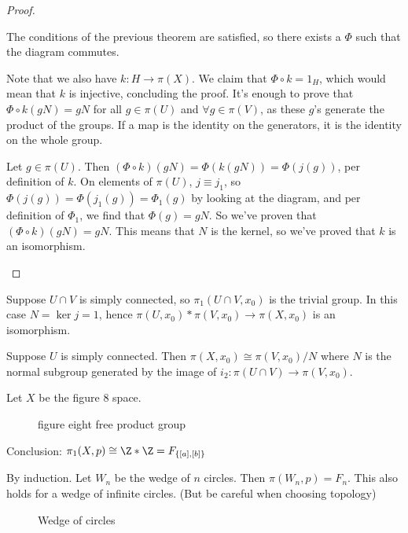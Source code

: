 \begin{proof}
\begin{itemize}
            The conditions of the previous theorem are satisfied, so there exists a $\Phi$ such that the diagram commutes.

            Note that we also have $k: H \to  \pi(X)$.
            We claim that $\Phi  \circ  k = 1_H$, which would mean that $k$ is injective, concluding the proof.
            It's enough to prove that $\Phi  \circ  k(gN) = gN$ for all $g \in \pi(U)$ and $\forall g \in \pi(V)$, as these $g$'s generate the product of the groups. If a map is the identity on the generators, it is the identity on the whole group.

            Let $g \in \pi(U)$. Then $(\Phi  \circ  k) (gN) = \Phi(k(gN)) = \Phi(j(g))$, per definition of $k$.
            On elements of $\pi(U)$, $j \equiv j_1$, so $\Phi(j(g)) = \Phi(j_1(g)) = \Phi_1(g)$ by looking at the diagram, and per definition of $\Phi_1$, we find that $\Phi(g) = gN$. So we've proven that $(\Phi  \circ  k) (gN) = gN$.
            This means that $N$ is the kernel, so we've proved that $k$ is an isomorphism.
    \end{itemize}
\end{proof}
\begin{corollary}
    Suppose $ U \cap  V$ is simply connected, so $\pi_1(U \cap V, x_0)$ is the trivial group.
    In this case $N = \ker j = 1$, hence $\pi(U, x_0) * \pi(V, x_0) \to \pi(X, x_0)$ is an isomorphism.
\end{corollary}

\begin{corollary}
    Suppose $U$ is simply connected.
    Then $\pi(X, x_0) \cong \pi(V, x_0) / N$ where $N$ is the normal subgroup generated by the image of $i_2: \pi(U \cap V) \to  \pi(V, x_0)$.
\end{corollary}
\begin{eg}
    Let $X$ be the figure $8$ space.

\begin{figure}[H]
    \centering
    \caption{figure eight free product group}
    \label{fig:figure-eight-free-product-group}
\end{figure}
Conclusion: $\pi_1(X, p) \cong \Z * \Z = F_{\{[a], [b]\} }$
\end{eg}

\begin{eg}
    By induction. Let $W_n$ be the wedge of $n$ circles.
    Then $\pi(W_n, p) = F_n$.
    This also holds for a wedge of infinite circles. (But be careful when choosing topology)
\begin{figure}[H]
    \centering
    \caption{Wedge of circles}
    \label{fig:wedge-circles}
\end{figure}
\end{eg}

